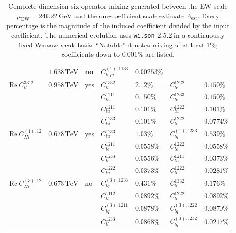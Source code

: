 \begin{table}[htbp]
\begin{tabular}{lllllll}
        & \(1.638\,\mathrm{TeV}\)
        & no
        & \(C_{lequ}^{(1),1133}\)&\(0.00253\%\)&&
        \\\midrule
        \(\operatorname{Re}C_{ll}^{3312}\)
        & \(0.958\,\mathrm{TeV}\)
        & yes
        & \(C_{ll}^{1332}\)&\(2.12\%\)&
          \(C_{le}^{1222}\)&\(0.150\%\)\\&&&
          \(C_{le}^{1211}\)&\(0.150\%\)&
          \(C_{le}^{1233}\)&\(0.150\%\)\\&&&
          \(C_{lu}^{1211}\)&\(0.101\%\)&
          \(C_{lu}^{1222}\)&\(0.101\%\)\\&&&
          \(C_{lu}^{1233}\)&\(0.101\%\)&
          \(C_{ll}^{1222}\)&\(0.0774\%\)
        \\\midrule
        \(\operatorname{Re}C_{Hl}^{(1),12}\)
        & \(0.678\,\mathrm{TeV}\)
        & yes
        & \(C_{lu}^{1233}\)&\(1.03\%\)&
          \(C_{lq}^{(1),1233}\)&\(0.539\%\)\\&&&
          \(C_{le}^{1211}\)&\(0.0558\%\)&
          \(C_{le}^{1222}\)&\(0.0558\%\)\\&&&
          \(C_{le}^{1233}\)&\(0.0556\%\)&
          \(C_{lu}^{1211}\)&\(0.0373\%\)\\&&&
          \(C_{lu}^{1222}\)&\(0.0373\%\)&
          \(C_{ll}^{1222}\)&\(0.0281\%\)
        \\\midrule
        \(\operatorname{Re}C_{Hl}^{(3),12}\)
        & \(0.678\,\mathrm{TeV}\)
        & no
        & \(C_{lq}^{(3),1233}\)&\(0.431\%\)&
          \(C_{ll}^{1332}\)&\(0.176\%\)\\&&&
          \(C_{ll}^{1112}\)&\(0.0892\%\)&
          \(C_{ll}^{1222}\)&\(0.0892\%\)\\&&&
          \(C_{lq}^{(3),1211}\)&\(0.0878\%\)&
          \(C_{lq}^{(3),1222}\)&\(0.0870\%\)\\&&&
          \(C_{ll}^{1233}\)&\(0.0868\%\)&
          \(C_{lq}^{(3),1232}\)&\(0.0217\%\)
        \\
        \bottomrule
    \end{tabular}
        \caption{%
        Complete dimension-six operator mixing generated between the EW scale 
        \(\mu_{\mathrm{EW}}=246.22\,\mathrm{GeV}\) and the
        one-coefficient scale estimate \(\Lambda_{\mathrm{est}}\).
        Every percentage is the magnitude of the induced coefficient divided
        by the input coefficient. The numerical evolution uses
        \texttt{wilson}~2.5.2 in a continuously fixed Warsaw weak basis.
        ``Notable'' denotes mixing of at least \(1\%\); coefficients down to
        \(0.001\%\) are listed.
    }
    \label{tab:smeft-rge-mixing-d6}
\end{table}




